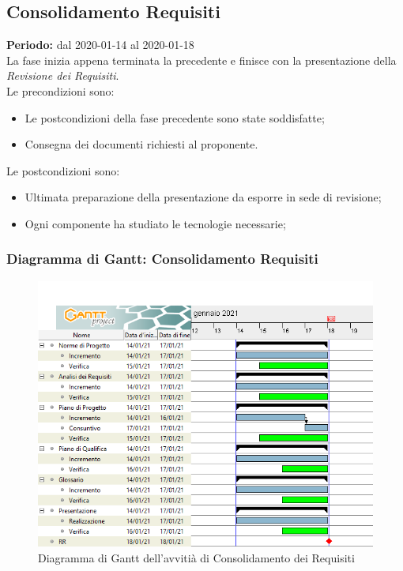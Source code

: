 \subsection{Consolidamento Requisiti}

\textbf{Periodo:} dal 2020-01-14 al 2020-01-18
\\La fase inizia appena terminata la precedente e finisce con la presentazione della \textit{Revisione dei Requisiti}.
\\Le precondizioni sono:
\begin{itemize}
    \item Le postcondizioni della fase precedente sono state soddisfatte;
    \item Consegna dei documenti richiesti al proponente.
\end{itemize}
Le postcondizioni sono:
\begin{itemize}
    \item Ultimata preparazione della presentazione da esporre in sede di revisione;
    \item Ogni componente ha studiato le tecnologie necessarie;
\end{itemize}


\subsubsection{Diagramma di Gantt: Consolidamento Requisiti}
\begin{figure}[ht]
    \centering
    \includegraphics[width=\textwidth]{../../Immagini/Consolidamento.png}
    \caption{Diagramma di Gantt dell'avvitià di Consolidamento dei Requisiti}
\end{figure}
